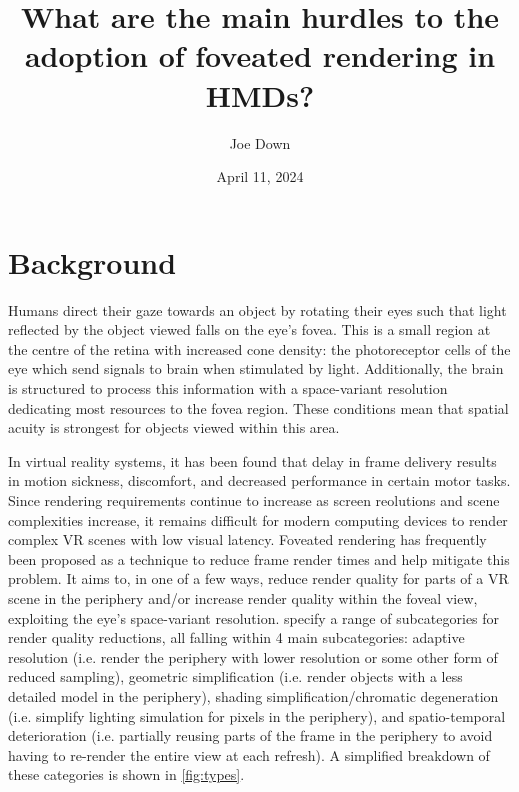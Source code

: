 \documentclass[a4paper,11pt]{article}
\title{What are the main hurdles to the adoption of foveated rendering in HMDs?}
\author{Joe Down}
\date{April 11, 2024}
\begin{document}
\maketitle

\section{Background}
Humans direct their gaze towards an object by rotating their eyes such that light reflected by the object viewed falls on the eye's fovea\cite{levoy1990gaze}. This is a small region at the centre of the retina with increased cone density\cite{pumphrey1948theory}: the photoreceptor cells of the eye which send signals to brain when stimulated by light\cite{arendt2003evolution}. Additionally, the brain is structured to process this information with a space-variant resolution dedicating most resources to the fovea region\cite{weber2009implementations}. These conditions mean that spatial acuity is strongest for objects viewed within this area\cite{levoy1990gaze}.

In virtual reality systems, it has been found that delay in frame delivery results in motion sickness, discomfort\cite{waltemate2016impact}, and decreased performance in certain motor tasks\cite{raaen2015measuring}. Since rendering requirements continue to increase as screen reolutions and scene complexities increase, it remains difficult for modern computing devices to render complex VR scenes with low visual latency\cite{wang2023foveated}. Foveated rendering has frequently been proposed as a technique to reduce frame render times and help mitigate this problem. It aims to, in one of a few ways, reduce render quality for parts of a VR scene in the periphery and/or increase render quality within the foveal view\cite{weier2016foveated}, exploiting the eye's space-variant resolution. \textcite{mohanto2022integrative} specify a range of subcategories for render quality reductions, all falling within 4 main subcategories: adaptive resolution (i.e. render the periphery with lower resolution or some other form of reduced sampling), geometric simplification (i.e. render objects with a less detailed model in the periphery), shading simplification/chromatic degeneration (i.e. simplify lighting simulation for pixels in the periphery), and spatio-temporal deterioration (i.e. partially reusing parts of the frame in the periphery to avoid having to re-render the entire view at each refresh). A simplified breakdown of these categories is shown in \cref{fig:types}.
\end{document}
